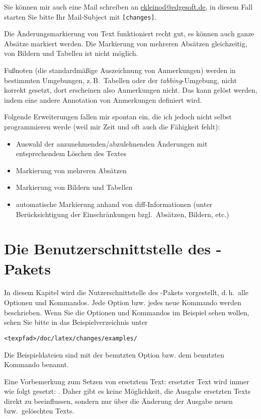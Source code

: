 Sie können mir auch eine Mail schreiben an \href{mailto:ekleinod@edgesoft.de}{ekleinod@edgesoft.de}, in diesem Fall starten Sie bitte Ihr Mail-Subject mit \texttt{[changes]}.

Die Änderungsmarkierung von Text funktioniert recht gut, es können auch ganze Absätze markiert werden.
Die Markierung von mehreren Absätzen gleichzeitig, von Bildern und Tabellen ist nicht möglich.

Fußnoten (die standardmäßige Auszeichnung von Anmerkungen) werden in bestimmten Umgebungen, z.\,B.\ Tabellen oder der \emph{tabbing}-Umgebung, nicht korrekt gesetzt, dort erscheinen also Anmerkungen nicht.
Das kann gelöst werden, indem eine andere Annotation von Anmerkungen definiert wird.

Folgende Erweiterungen fallen mir spontan ein, die ich jedoch nicht selbst programmieren werde (weil mir Zeit und oft auch die Fähigkeit fehlt):
\begin{itemize}
	\item Auswahl der anzunehmenden/abzulehnenden Änderungen mit entsprechendem Löschen des Textes
	\item Markierung von mehreren Absätzen
	\item Markierung von Bildern und Tabellen
	\item automatische Markierung anhand von diff-Informationen (unter Berücksichtigung der Einschränkungen bzgl.\ Absätzen, Bildern, etc.)
\end{itemize}

\section{Die Benutzerschnittstelle des -Pakets}
\label{sec:user}

In diesem Kapitel wird die Nutzerschnittstelle des -Pakets vorgestellt, d.\,h.\ alle Optionen und Kommandos.
Jede Option bzw. jedes neue Kommando werden beschrieben.
Wenn Sie die Optionen und Kommandos im Beispiel sehen wollen, sehen Sie bitte in das Beispielverzeichnis unter

\texttt{<texpfad>/doc/latex/changes/examples/}

Die Beispieldateien sind mit der benutzten Option bzw. dem benutzten Kommando benannt.

Eine Vorbemerkung zum Setzen von ersetztem Text: ersetzter Text wird immer wie folgt gesetzt: .
Daher gibt es keine Möglichkeit, die Ausgabe ersetzten Texts direkt zu beeinflussen, sondern nur über die Änderung der Ausgabe neuen bzw.\ gelöschten Texts.

